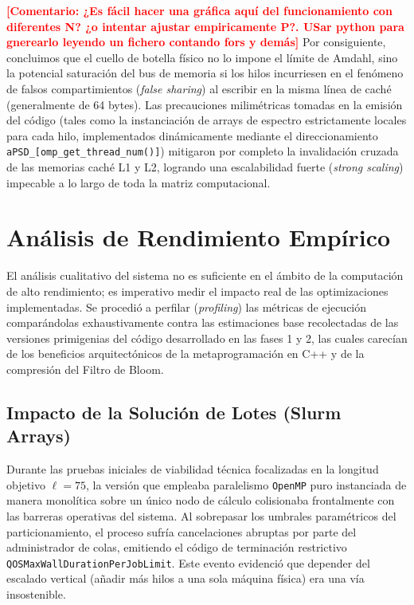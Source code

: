 \documentclass[12pt,a4paper]{tfg_domingo}
\newcommand{\Comentario}[1]{\textcolor{red}{\textbf{[Comentario:
      #1]}}}
\begin{document}
\Comentario{¿Es fácil hacer una gráfica aquí del funcionamiento con diferentes N? ¿o intentar ajustar empiricamente P?. USar python para gnerearlo leyendo un fichero contando fors y demás}
Por consiguiente, concluimos que el cuello de botella físico no lo
impone el límite de Amdahl, sino la potencial saturación del bus de
memoria si los hilos incurriesen en el fenómeno de falsos
compartimientos (\emph{false sharing}) al escribir en la misma línea
de caché (generalmente de 64 bytes). Las precauciones milimétricas
tomadas en la emisión del código (tales como la instanciación de
arrays de espectro estrictamente locales para cada hilo, implementados
dinámicamente mediante el direccionamiento
\texttt{aPSD\_[omp\_get\_thread\_num()]}) mitigaron por completo la
invalidación cruzada de las memorias caché L1 y L2, logrando una
escalabilidad fuerte (\emph{strong scaling}) impecable a lo largo de
toda la matriz computacional. 

\section{Análisis de Rendimiento Empírico}

El análisis cualitativo del sistema no es suficiente en el ámbito de
la computación de alto rendimiento; es imperativo medir el impacto
real de las optimizaciones implementadas. Se procedió a perfilar
(\emph{profiling}) las métricas de ejecución comparándolas
exhaustivamente contra las estimaciones base recolectadas de las
versiones primigenias del código desarrollado en las fases 1 y 2, las
cuales carecían de los beneficios arquitectónicos de la
metaprogramación en C++ y de la compresión del Filtro de Bloom. 

\subsection{Impacto de la Solución de Lotes (Slurm Arrays)}

Durante las pruebas iniciales de viabilidad técnica focalizadas en la
longitud objetivo $\ell=75$, la versión que empleaba paralelismo
\texttt{OpenMP} puro instanciada de manera monolítica sobre un único
nodo de cálculo colisionaba frontalmente con las barreras operativas
del sistema. Al sobrepasar los umbrales paramétricos del
particionamiento, el proceso sufría cancelaciones abruptas por parte
del administrador de colas, emitiendo el código de terminación
restrictivo \texttt{QOSMaxWallDurationPerJobLimit}. Este evento
evidenció que depender del escalado vertical (añadir más hilos a una
sola máquina física) era una vía insostenible. 
\end{document}
